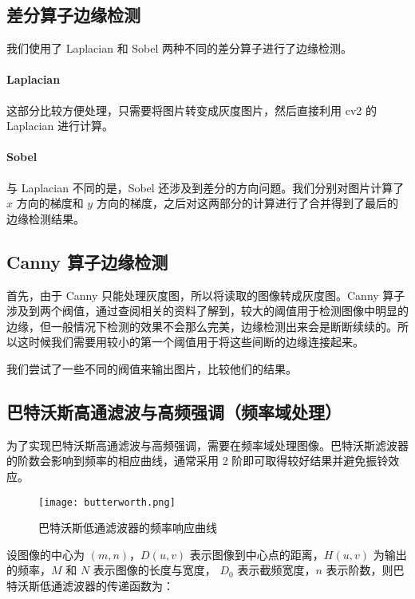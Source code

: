 \documentclass[11pt]{ctexart}
\begin{document}
\subsection{差分算子边缘检测}

我们使用了 Laplacian 和 Sobel 两种不同的差分算子进行了边缘检测。

\paragraph{Laplacian}

这部分比较方便处理，只需要将图片转变成灰度图片，然后直接利用 cv2 的 Laplacian 进行计算。

\paragraph{Sobel}

与 Laplacian 不同的是，Sobel 还涉及到差分的方向问题。我们分别对图片计算了 $x$ 方向的梯度和 $y$ 方向的梯度，之后对这两部分的计算进行了合并得到了最后的边缘检测结果。

\subsection{Canny 算子边缘检测}

首先，由于 Canny 只能处理灰度图，所以将读取的图像转成灰度图。Canny 算子涉及到两个阀值，通过查阅相关的资料了解到，较大的阈值用于检测图像中明显的边缘，但一般情况下检测的效果不会那么完美，边缘检测出来会是断断续续的。所以这时候我们需要用较小的第一个阈值用于将这些间断的边缘连接起来。

我们尝试了一些不同的阀值来输出图片，比较他们的结果。

\subsection{巴特沃斯高通滤波与高频强调（频率域处理）}

为了实现巴特沃斯高通滤波与高频强调，需要在频率域处理图像。巴特沃斯滤波器的阶数会影响到频率的相应曲线，通常采用 2 阶即可取得较好结果并避免振铃效应。

  \begin{figure}[htbp]
        \centering
        \texttt{[image: butterworth.png]}
        \caption{巴特沃斯低通滤波器的频率响应曲线}\label{fig:digit}
  \end{figure}
  
设图像的中心为 $(m, n)$，$D(u, v)$ 表示图像到中心点的距离，$H(u, v)$ 为输出的频率，$M$ 和 $N$ 表示图像的长度与宽度， $D_{0}$ 表示截频宽度，$n$ 表示阶数，则巴特沃斯低通滤波器的传递函数为：
\end{document}
